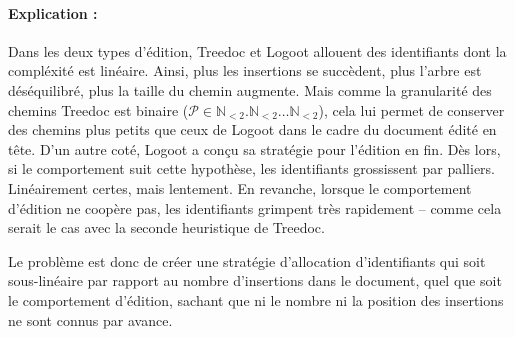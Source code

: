 \paragraph{Explication :} Dans les deux types d'édition, Treedoc et Logoot
allouent des identifiants dont la compléxité est linéaire. Ainsi, plus les
insertions se succèdent, plus l'arbre est déséquilibré, plus la taille du chemin
augmente. Mais comme la granularité des chemins Treedoc est binaire
($\mathcal{P}\in \mathbb{N}_{<2}.\mathbb{N}_{<2}\ldots\mathbb{N}_{<2}$), cela
lui permet de conserver des chemins plus petits que ceux de Logoot dans le cadre
du document édité en tête. D'un autre coté, Logoot a conçu sa stratégie pour
l'édition en fin. Dès lors, si le comportement suit cette hypothèse, les
identifiants grossissent par palliers. Linéairement certes, mais lentement. En
revanche, lorsque le comportement d'édition ne coopère pas, les identifiants
grimpent très rapidement -- comme cela serait le cas avec la seconde heuristique
de Treedoc.



Le problème est donc de créer une stratégie d'allocation d'identifiants qui soit
sous-linéaire par rapport au nombre d'insertions dans le document, quel que soit
le comportement d'édition, sachant que ni le nombre ni la position des
insertions ne sont connus par avance. 


